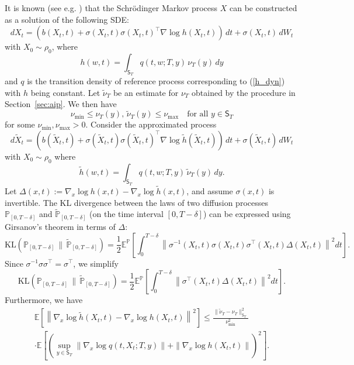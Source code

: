\documentclass[a4paper,11pt]{amsart}
\theoremstyle{plain}
\theoremstyle{remark}
\begin{document}
It is known (see e.g. \cite{daipra1991}) that the Schr\"odinger Markov process $X$  can be constructed as a solution of the following SDE: 
\begin{equation}\label{h_dyn}
    d X_{t}
    = \left( b(X_{t}, t) + \sigma(X_{t}, t) \sigma(X_{t}, t)^\top \nabla\log h(X_{t}, t) \right) \, d t + \sigma(X_{t}, t) \, d W_{t}
    \end{equation}
with \(X_{0} \sim \rho_0\), 
where
\[
    h(w, t)
    = \int_{\mathsf{S}_T} q(t,w;T,y) \, \nu_{T}  (y)\,dy
\]
and $q$ is the transition density of reference process corresponding to
(\ref{h_dyn}) with $h$ being constant.
Let \(\widetilde{\nu}_T\) be an  estimate for \(\nu_T\) obtained 
by the procedure in Section~\ref{sec:aip}. We then have
\[
        \nu_{\min} \leq \nu_T(y), \, \widetilde{\nu}_T(y) \leq \nu_{\max} \quad \text{for all } y \in \mathsf{S}_T
    \]
   for some \(\nu_{\min},\nu_{\max}>0.\) Consider the approximated process
\[
    d \widetilde{X}_{t}
    = \left( b(\widetilde{X}_{t}, t) + \sigma(\widetilde{X}_{t}, t) \sigma(\widetilde{X}_{t}, t)^\top \nabla\log \widetilde{h}(\widetilde{X}_{t}, t) \right) \, d t + \sigma(\widetilde{X}_{t}, t) \, d W_{t}
    \]
with \(X_{0} \sim \rho_0\) 
where
\[
    \widetilde{h}(w, t)
    = \int_{\mathsf{S}_T} q(t,w;T,y) \, \widetilde{\nu}_{T}  (y)\,dy.
\] 
Let $\Delta(x,t) := \nabla_x \log h(x,t) - \nabla_x \log \widetilde{h}(x,t)$, and assume $\sigma(x,t)$ is invertible. The KL divergence between the laws of two diffusion processes $\mathbb{P}_{[0,T-\delta]}$ and $\widetilde{\mathbb{P}}_{[0,T-\delta]}$ (on the time interval $[0,T-\delta]$) can be expressed using Girsanov's theorem in terms of $\Delta:$
$$
\mathrm{KL}(\mathbb{P}_{[0,T-\delta]} \,\|\, \widetilde{\mathbb{P}}_{[0,T-\delta]})
= \frac{1}{2} \mathbb{E}^{\mathbb{P}} \left[ \int_0^{T-\delta} \left\| \sigma^{-1}(X_t,t) \sigma(X_t,t)\sigma^\top(X_t,t) \Delta(X_t,t) \right\|^2 dt \right].
$$
Since $\sigma^{-1} \sigma \sigma^\top = \sigma^\top$,  we simplify
$$
\mathrm{KL}(\mathbb{P}_{[0,T-\delta]} \,\|\, \widetilde{\mathbb{P}}_{[0,T-\delta]})
= \frac{1}{2} \mathbb{E}^{\mathbb{P}} \left[ \int_0^{T-\delta} \left\| \sigma^\top(X_t,t) \Delta(X_t,t) \right\|^2 dt \right].
$$
Furthermore, we have
\begin{multline*}
\mathbb{E} \left[ \left\| \nabla_x \log \widetilde{h}(X_t,t) - \nabla_x \log h(X_t,t) \right\|^2 \right]
\leq \frac{\| \widetilde{\nu}_T - \nu_T \|_{\mathsf{S}_T}^2}{\nu_{\min}^2} 
\\
\cdot \mathbb{E} \left[
\left( \sup_{y \in \mathsf{S}_T} \| \nabla_x \log q(t,X_t;T,y) \| + \| \nabla_x \log h(X_t,t) \| \right)^2
\right].
\end{multline*}
\end{document}
